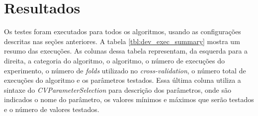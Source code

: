 \section{Resultados}

Os testes foram executados para todos os algoritmos, usando as configurações descritas nas seções anteriores. A tabela \ref{tbl:dev_exec_summary} mostra um resumo das execuções. As colunas dessa tabela representam, da esquerda para a direita, a categoria do algoritmo, o algoritmo, o número de execuções do experimento, o número de \emph{folds} utilizado no \emph{cross-validation}, o número total de execuções do algoritmo e os parâmetros testados. Essa última coluna utiliza a sintaxe do \emph{CVParameterSelection} para descrição dos parâmetros, onde são indicados o nome do parâmetro, os valores mínimos e máximos que serão testados e o número de valores testados.

